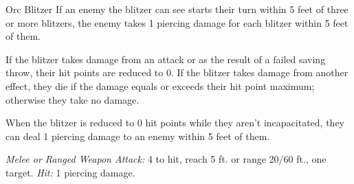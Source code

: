 \documentclass[10pt,a4paper,twoside,bg=print,twocolumn,openany,nodeprecatedcode]{dndbook}
\begin{document}
\begin{DndMonster}[float=t]{Orc Blitzer}
\DndMonsterBasics[
armor-class = {13 (studded leather armor)},
hit-points = {\DndDice{7}},
speed = {35 ft.}
]
\DndMonsterAbilityScores[
 str = 15,
 dex = 12,
 con = 12,
 int = 10,
 wis = 11,
 cha = 11
]
\DndMonsterDetails[
senses = {darkvision 60 ft., passive perception 10},
languages = {Common, Orc},
challenge = 1/2,
]
If an enemy the blitzer can see starts their turn within 5 feet of three or more blitzers, the enemy takes 1 piercing damage for each blitzer within 5 feet of them.

If the blitzer takes damage from an attack or as the result of a failed saving throw, their hit points are reduced to 0. If the blitzer takes damage from another effect, they die if the damage equals or exceeds their hit point maximum; otherwise they take no damage.

When the blitzer is reduced to 0 hit points while they aren't incapacitated, they can deal 1 piercing damage to an enemy within 5 feet of them.

\textsl{Melee or Ranged Weapon Attack:} 4 to hit, reach 5 ft. or range 20/60 ft., one target. \textsl{Hit:} 1 piercing damage.

\end{DndMonster}
\end{document}
